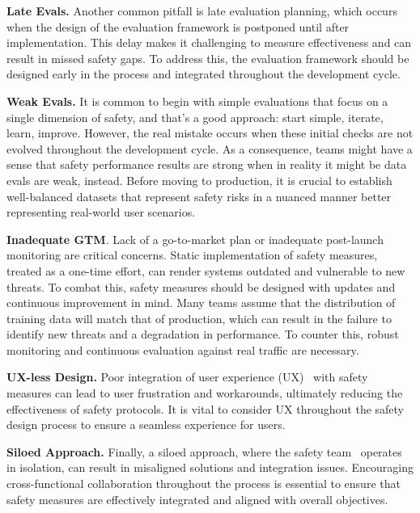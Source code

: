 \textbf{Late Evals.} Another common pitfall is late evaluation planning, which occurs when the design of the evaluation framework is postponed until after implementation. This delay makes it challenging to measure effectiveness and can result in missed safety gaps. To address this, the evaluation framework should be designed early in the process and integrated throughout the development cycle.

\textbf{Weak Evals.} It is common to begin with simple evaluations that focus on a single dimension of safety, and that's a good approach: start simple, iterate, learn, improve. However, the real mistake occurs when these initial checks are not evolved throughout the development cycle. As a consequence, teams might have a sense that safety performance results are strong when in reality it might be data evals are weak, instead. Before moving to production, it is crucial to establish well-balanced datasets that represent safety risks in a nuanced manner better representing real-world user scenarios.

\textbf{Inadequate GTM}. Lack of a go-to-market plan or inadequate post-launch monitoring are critical concerns. Static implementation of safety measures, treated as a one-time effort, can render systems outdated and vulnerable to new threats. To combat this, safety measures should be designed with updates and continuous improvement in mind. Many teams assume that the distribution of training data will match that of production, which can result in the failure to identify new threats and a degradation in performance. To counter this, robust monitoring and continuous evaluation against real traffic are necessary.

\textbf{UX-less Design.} Poor integration of user experience (UX)~ with safety measures can lead to user frustration and workarounds, ultimately reducing the effectiveness of safety protocols. It is vital to consider UX throughout the safety design process to ensure a seamless experience for users.

\textbf{Siloed Approach.} Finally, a siloed approach, where the safety team~ operates in isolation, can result in misaligned solutions and integration issues. Encouraging cross-functional collaboration throughout the process is essential to ensure that safety measures are effectively integrated and aligned with overall objectives.


